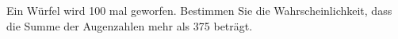 \begin{exercise}
Ein Würfel wird 100 mal geworfen. Bestimmen Sie die Wahrscheinlichkeit, dass die Summe
der Augenzahlen mehr als 375 beträgt.
\end{exercise}
\begin{solution}
\end{solution}
